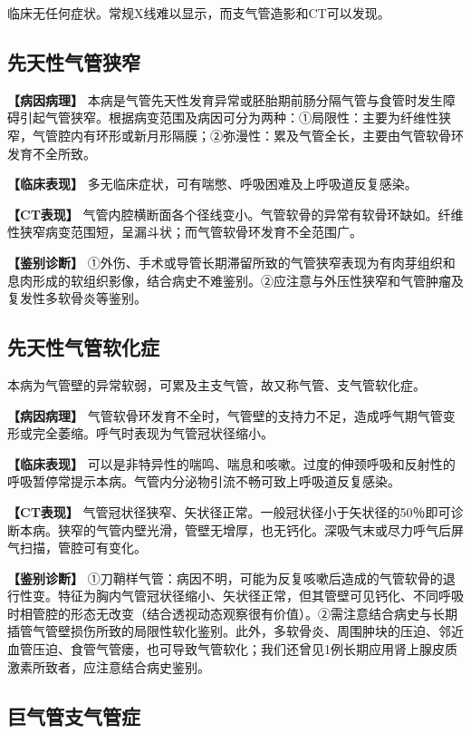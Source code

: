 临床无任何症状。常规X线难以显示，而支气管造影和CT可以发现。

\subsection{先天性气管狭窄}

\textbf{【病因病理】}
本病是气管先天性发育异常或胚胎期前肠分隔气管与食管时发生障碍引起气管狭窄。根据病变范围及病因可分为两种：①局限性：主要为纤维性狭窄，气管腔内有环形或新月形隔膜；②弥漫性：累及气管全长，主要由气管软骨环发育不全所致。

\textbf{【临床表现】}
多无临床症状，可有喘憋、呼吸困难及上呼吸道反复感染。

\textbf{【CT表现】}
气管内腔横断面各个径线变小。气管软骨的异常有软骨环缺如。纤维性狭窄病变范围短，呈漏斗状；而气管软骨环发育不全范围广。

\textbf{【鉴别诊断】}
①外伤、手术或导管长期滞留所致的气管狭窄表现为有肉芽组织和息肉形成的软组织影像，结合病史不难鉴别。②应注意与外压性狭窄和气管肿瘤及复发性多软骨炎等鉴别。

\subsection{先天性气管软化症}

本病为气管壁的异常软弱，可累及主支气管，故又称气管、支气管软化症。

\textbf{【病因病理】}
气管软骨环发育不全时，气管壁的支持力不足，造成呼气期气管变形或完全萎缩。呼气时表现为气管冠状径缩小。

\textbf{【临床表现】}
可以是非特异性的喘鸣、喘息和咳嗽。过度的伸颈呼吸和反射性的呼吸暂停常提示本病。气管内分泌物引流不畅可致上呼吸道反复感染。

\textbf{【CT表现】}
气管冠状径狭窄、矢状径正常。一般冠状径小于矢状径的50％即可诊断本病。狭窄的气管内壁光滑，管壁无增厚，也无钙化。深吸气末或尽力呼气后屏气扫描，管腔可有变化。

\textbf{【鉴别诊断】}
①刀鞘样气管：病因不明，可能为反复咳嗽后造成的气管软骨的退行性变。特征为胸内气管冠状径缩小、矢状径正常，但其管壁可见钙化、不同呼吸时相管腔的形态无改变（结合透视动态观察很有价值）。②需注意结合病史与长期插管气管壁损伤所致的局限性软化鉴别。此外，多软骨炎、周围肿块的压迫、邻近血管压迫、食管气管瘘，也可导致气管软化；我们还曾见1例长期应用肾上腺皮质激素所致者，应注意结合病史鉴别。

\subsection{巨气管支气管症}

